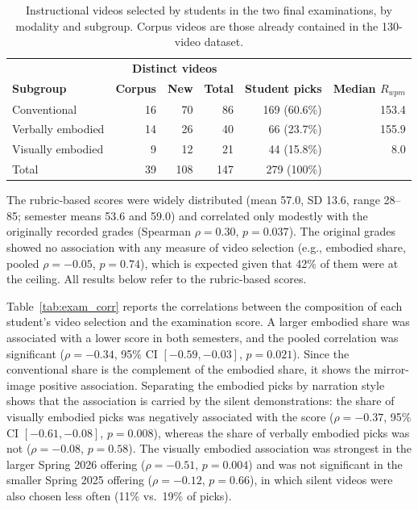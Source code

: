 \documentclass[fleqn,10pt]{JLA_article} %
\begin{document}
\begin{table}[h!]
    \centering
    \caption{Instructional videos selected by students in the two final examinations, by modality and subgroup. Corpus videos are those already contained in the 130-video dataset.}
    \begin{tabular}{l r r r r r}
        \toprule
        & \multicolumn{3}{c}{\textbf{Distinct videos}} & & \\
        \textbf{Subgroup} & \textbf{Corpus} & \textbf{New} & \textbf{Total} & \textbf{Student picks} & \textbf{Median $R_{wpm}$} \\
        \midrule
        Conventional & 16 & 70 & 86 & 169 (60.6\%) & 153.4 \\
        Verbally embodied & 14 & 26 & 40 & 66 (23.7\%) & 155.9 \\
        Visually embodied & 9 & 12 & 21 & 44 (15.8\%) & 8.0 \\
        \midrule
        Total & 39 & 108 & 147 & 279 (100\%) & \\
        \bottomrule
    \end{tabular}
    \label{tab:exam_videos}
\end{table}

The rubric-based scores were widely distributed (mean 57.0, SD 13.6, range 28--85; semester means 53.6 and 59.0) and correlated only modestly with the originally recorded grades (Spearman $\rho = 0.30$, $p = 0.037$). The original grades showed no association with any measure of video selection (e.g., embodied share, pooled $\rho = -0.05$, $p = 0.74$), which is expected given that 42\% of them were at the ceiling. All results below refer to the rubric-based scores.

Table~\ref{tab:exam_corr} reports the correlations between the composition of each student's video selection and the examination score. A larger embodied share was associated with a lower score in both semesters, and the pooled correlation was significant ($\rho = -0.34$, 95\% CI $[-0.59, -0.03]$, $p = 0.021$). Since the conventional share is the complement of the embodied share, it shows the mirror-image positive association. Separating the embodied picks by narration style shows that the association is carried by the silent demonstrations: the share of visually embodied picks was negatively associated with the score ($\rho = -0.37$, 95\% CI $[-0.61, -0.08]$, $p = 0.008$), whereas the share of verbally embodied picks was not ($\rho = -0.08$, $p = 0.58$). The visually embodied association was strongest in the larger Spring 2026 offering ($\rho = -0.51$, $p = 0.004$) and was not significant in the smaller Spring 2025 offering ($\rho = -0.12$, $p = 0.66$), in which silent videos were also chosen less often (11\% vs.\ 19\% of picks).
\end{document}
